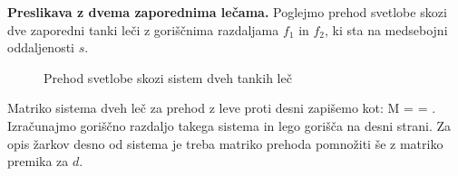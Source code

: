 \begin{example}{\bf Preslikava z dvema zaporednima lečama.}
Poglejmo prehod svetlobe skozi dve zaporedni tanki leči z goriščnima
razdaljama $f_1$ in $f_2$, ki sta na medsebojni oddaljenosti $s$.
\begin{figure}[!h]
\centering
\def\svgwidth{100truemm} 

\caption{Prehod svetlobe skozi sistem dveh tankih leč}
\label{fig:02_lecje}
\end{figure}

Matriko sistema dveh leč za prehod z leve proti desni zapišemo kot:
\beq
M = 
\cdot 
\left[\begin{array}{cc}
1& s\\
0&1
\end{array}\right]\cdot
{} = 
\!\!.
\label{eq:02_54}
\eeq
Izračunajmo goriščno razdaljo takega sistema in lego gorišča
na desni strani. Za opis  žarkov desno
od sistema je treba matriko prehoda pomnožiti še z matriko premika za $d$. 


\end{example}
